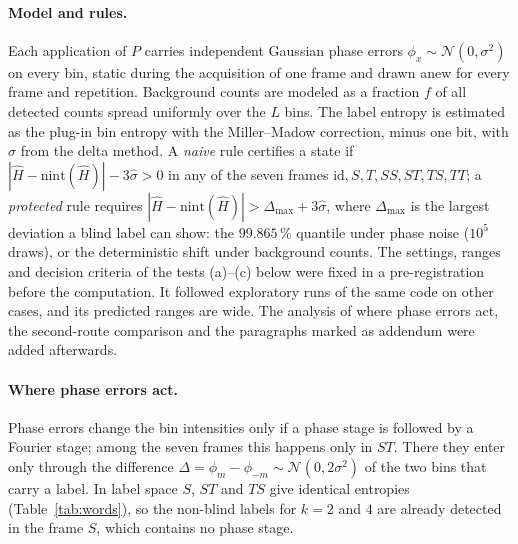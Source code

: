 \documentclass[aps,pra,reprint,superscriptaddress,nofootinbib]{revtex4-2}
\begin{document}
\paragraph*{Model and rules.}
Each application of $P$ carries independent Gaussian phase errors $\phi_x\sim\mathcal N(0,\sigma^2)$ on every bin, static during the acquisition of one frame and drawn anew for every frame and repetition.
Background counts are modeled as a fraction $f$ of all detected counts spread uniformly over the $L$ bins.
The label entropy is estimated as the plug-in bin entropy with the Miller--Madow correction, minus one bit, with $\hat\sigma$ from the delta method.
A \emph{naive} rule certifies a state if $|\hat H-\mathrm{nint}(\hat H)|-3\hat\sigma>0$ in any of the seven frames $\mathrm{id},S,T,SS,ST,TS,TT$; a \emph{protected} rule requires $|\hat H-\mathrm{nint}(\hat H)|>\Delta_{\max}+3\hat\sigma$, where $\Delta_{\max}$ is the largest deviation a blind label can show: the $99.865\,\%$ quantile under phase noise ($10^5$ draws), or the deterministic shift under background counts.
The settings, ranges and decision criteria of the tests (a)--(c) below were fixed in a pre-registration before the computation. It followed exploratory runs of the same code on other cases, and its predicted ranges are wide. The analysis of where phase errors act, the second-route comparison and the paragraphs marked as addendum were added afterwards.

\paragraph*{Where phase errors act.}
Phase errors change the bin intensities only if a phase stage is followed by a Fourier stage; among the seven frames this happens only in $ST$.
There they enter only through the difference $\Delta=\phi_m-\phi_{-m}\sim\mathcal N(0,2\sigma^2)$ of the two bins that carry a label.
In label space $S$, $ST$ and $TS$ give identical entropies (Table~\ref{tab:words}), so the non-blind labels for $k=2$ and $4$ are already detected in the frame $S$, which contains no phase stage.
\end{document}
